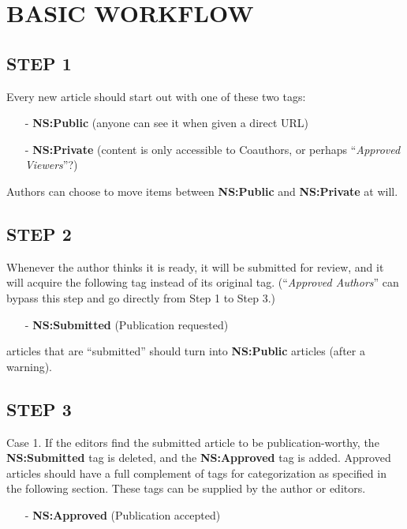 \documentclass[12pt]{article}
\begin{document}
\section{BASIC WORKFLOW}

\subsection*{STEP 1}

Every new article should start out with one of these two
tags:

\begin{itemize}
\item[-] {\bf NS:Public} (anyone can see it when given a direct URL)
\item[-] {\bf NS:Private} (content is only accessible to
 Coauthors, or perhaps ``\emph{Approved Viewers}''?)
\end{itemize}

\noindent Authors can choose to move items between {\bf NS:Public} and
{\bf NS:Private} at will.

\subsection*{STEP 2}

Whenever the author thinks it is ready, it will be
submitted for review, and it will acquire the following
tag instead of its original tag. (``\emph{Approved
 Authors}'' can bypass this step and go directly from
Step 1 to Step 3.)

\begin{itemize}
\item[-] {\bf NS:Submitted} (Publication requested)
\end{itemize}

 articles that are ``submitted'' should turn into
{\bf NS:Public} articles (after a warning).

\subsection*{STEP 3}

Case 1. If the editors find the submitted article to be
publication-worthy, the {\bf NS:Submitted} tag is deleted,
and the {\bf NS:Approved} tag is added. Approved articles
should have a full complement of tags for categorization
as specified in the following section. These tags can be
supplied by the author or editors.

\begin{itemize}
\item[-] {\bf NS:Approved} (Publication accepted)
\end{itemize}
\end{document}
